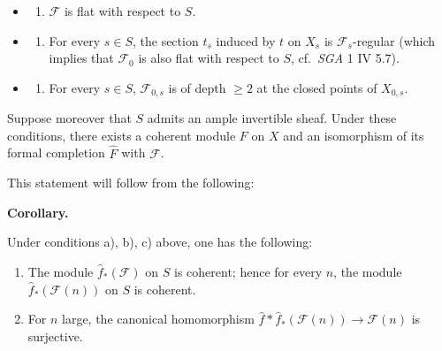 \documentclass[
  11pt,
  a4paper,
]{book}
\providecommand{\tightlist}{%
  \setlength{\itemsep}{0pt}\setlength{\parskip}{0pt}}
\begin{document}
\begin{itemize}
\tightlist
\item
  \begin{enumerate}
  \def\labelenumi{\alph{enumi})}
  \tightlist
  \item
    \(\mathcal{F}\) is flat with respect to \(S\).
  \end{enumerate}
\item
  \begin{enumerate}
  \def\labelenumi{\alph{enumi})}
  \setcounter{enumi}{1}
  \tightlist
  \item
    For every \(s \in S\), the section \(t_{s}\) induced by \(t\) on
    \(X_{s}\) is \(\mathcal{F}_{s}\)-regular (which implies that
    \(\mathcal{F}_{0}\) is also flat with respect to \(S\),
    cf.~\emph{SGA} 1 IV 5.7).
  \end{enumerate}
\item
  \begin{enumerate}
  \def\labelenumi{\alph{enumi})}
  \setcounter{enumi}{2}
  \tightlist
  \item
    For every \(s \in S\), \(\mathcal{F}_{0,s}\) is of depth
    \(\geqslant 2\) at the closed points of \(X_{0,s}\).
  \end{enumerate}
\end{itemize}

Suppose moreover that \(S\) admits an ample invertible sheaf. Under
these conditions, there exists a coherent module \(F\) on \(X\) and an
isomorphism of its formal completion \(\hat{F}\) with \(\mathcal{F}\).

This statement will follow from the following:

\textbf{Corollary.}

Under conditions a), b), c) above, one has the following:

\begin{enumerate}
\def\labelenumi{\arabic{enumi}.}
\item
  The module \(\hat{f}_{\ast}(\mathcal{F})\) on \(S\) is coherent; hence
  for every \(n\), the module \(\hat{f}_{\ast}(\mathcal{F}(n))\) on
  \(S\) is coherent.
\item
  For \(n\) large, the canonical homomorphism
  \(\hat{f}*\hat{f}_{\ast}(\mathcal{F}(n)) \to \mathcal{F}(n)\) is
  surjective.
\end{enumerate}
\end{document}
